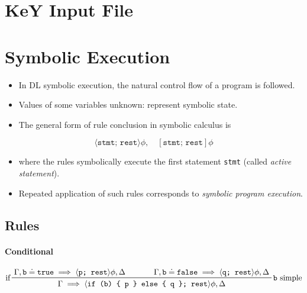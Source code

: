 
	\section{KeY Input File} %

	\section{Symbolic Execution} %
		\begin{itemize}
			\item In DL symbolic execution, the natural control flow of a program is followed.
			\item Values of some variables unknown: represent symbolic state.
			\item The general form of rule conclusion in symbolic calculus is
		\end{itemize}
		\begin{equation*}
			\langle \texttt{stmt; rest} \rangle \phi, \quad [\texttt{stmt; rest}] \phi
		\end{equation*}
		\begin{itemize}
			\item[] where the rules symbolically execute the first statement \texttt{stmt} (called \textit{active statement}).
			\item Repeated application of such rules corresponds to \textit{symbolic program execution}.
		\end{itemize}

		\subsection{Rules} %
			\paragraph{Conditional} %
			\begin{equation*}
				\prftree[l, r]
					{\texttt{b} simple}
					{if}
					{\Gamma, \texttt{b} \doteq \texttt{true} \implies \langle \texttt{p; rest} \rangle \phi, \Delta}
					{\qquad}
					{\Gamma, \texttt{b} \doteq \texttt{false} \implies \langle \texttt{q; rest} \rangle \phi, \Delta}
					{\Gamma \implies \langle \texttt{if (b) \{ p \} else \{ q \}; rest} \rangle \phi, \Delta}
			\end{equation*}
			
